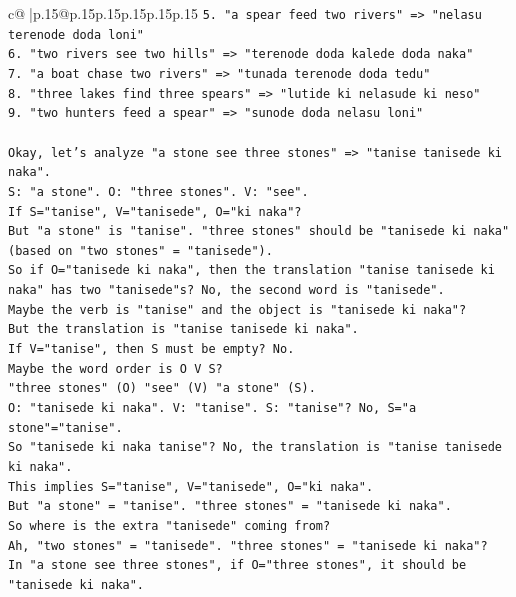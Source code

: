 \documentclass{article}
\begin{document}
{\begin{supertabular}{c@{$\;$}|p{.15\linewidth}@{}p{.15\linewidth}p{.15\linewidth}p{.15\linewidth}p{.15\linewidth}p{.15\linewidth}}
{{{\texttt{5. "a spear feed two rivers" => "nelasu terenode doda loni"} \\
\texttt{6. "two rivers see two hills" => "terenode doda kalede doda naka"} \\
\texttt{7. "a boat chase two rivers" => "tunada terenode doda tedu"} \\
\texttt{8. "three lakes find three spears" => "lutide ki nelasude ki neso"} \\
\texttt{9. "two hunters feed a spear" => "sunode doda nelasu loni"} \\
\\ 
\texttt{Okay, let's analyze "a stone see three stones" => "tanise tanisede ki naka".} \\
\texttt{S: "a stone". O: "three stones". V: "see".} \\
\texttt{If S="tanise", V="tanisede", O="ki naka"?} \\
\texttt{But "a stone" is "tanise". "three stones" should be "tanisede ki naka" (based on "two stones" = "tanisede").} \\
\texttt{So if O="tanisede ki naka", then the translation "tanise tanisede ki naka" has two "tanisede"s? No, the second word is "tanisede".} \\
\texttt{Maybe the verb is "tanise" and the object is "tanisede ki naka"?} \\
\texttt{But the translation is "tanise tanisede ki naka".} \\
\texttt{If V="tanise", then S must be empty? No.} \\
\texttt{Maybe the word order is O V S?} \\
\texttt{"three stones" (O) "see" (V) "a stone" (S).} \\
\texttt{O: "tanisede ki naka". V: "tanise". S: "tanise"? No, S="a stone"="tanise".} \\
\texttt{So "tanisede ki naka tanise"? No, the translation is "tanise tanisede ki naka".} \\
\texttt{This implies S="tanise", V="tanisede", O="ki naka".} \\
\texttt{But "a stone" = "tanise". "three stones" = "tanisede ki naka".} \\
\texttt{So where is the extra "tanisede" coming from?} \\
\texttt{Ah, "two stones" = "tanisede". "three stones" = "tanisede ki naka"?} \\
\texttt{In "a stone see three stones", if O="three stones", it should be "tanisede ki naka".} \\
}}}
\end{supertabular}}
\end{document}
